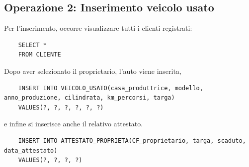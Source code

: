 \documentclass[a4paper,12pt]{report}
\begin{document}
\subsection*{Operazione 2: Inserimento veicolo usato}
Per l'inserimento, occorre visualizzare tutti i clienti registrati:
\begin{lstlisting}
	SELECT * 
	FROM CLIENTE
\end{lstlisting}
Dopo aver selezionato il proprietario, l'auto viene inserita,
\begin{lstlisting}
	INSERT INTO VEICOLO_USATO(casa_produttrice, modello, anno_produzione, cilindrata, km_percorsi, targa) 
	VALUES(?, ?, ?, ?, ?, ?)
\end{lstlisting}
e infine si inserisce anche il relativo attestato.
\begin{lstlisting}
	INSERT INTO ATTESTATO_PROPRIETA(CF_proprietario, targa, scaduto, data_attestato) 
	VALUES(?, ?, ?, ?)
\end{lstlisting}
\end{document}
